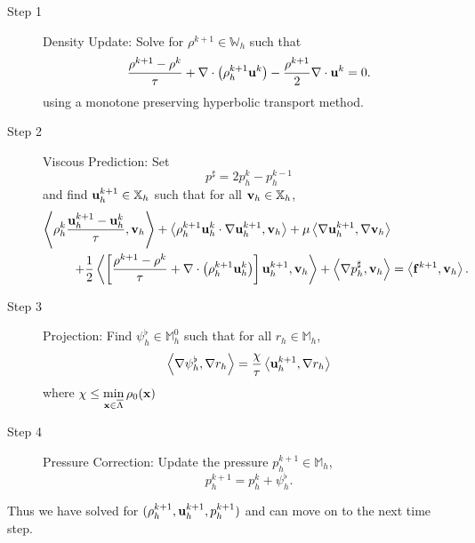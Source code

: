 \documentclass[letterpaper]{erdc}
\begin{document}
\begin{description}
  \item[Step 1] Density Update: Solve for $\rho^{k+1}\in \mathbb{W}_h$ such that
\begin{equation}
  \frac{\rho^{k+1} - \rho^k}{\tau} + \nabla\cdot\left(\rho_h^{k+1}\textbf{u}^{k} \right) - \frac{\rho^{k+1}}{2}\nabla\cdot\textbf{u}^{k} = 0.
\end{equation}
using a monotone preserving hyperbolic transport method.  

\item[Step 2] Viscous Prediction: Set 
\begin{equation}\label{eq:pressureextrapolation_uniformtimestep}
  p^{\sharp} = 2p_h^{k} - p_h^{k-1}
\end{equation}
and find $\textbf{u}^{k+1}_h\in\mathbb{X}_h$ such that for all $\textbf{v}_h\in\mathbb{X}_h$,
\begin{equation}
  \begin{split}
\left\langle  \rho_h^{k}\frac{\textbf{u}_h^{k+1}-\textbf{u}_h^{k} }{\tau} , \textbf{v}_h \right\rangle + \left\langle  \rho_h^{k+1}\textbf{u}_h^{k}\cdot\nabla\textbf{u}_h^{k+1} , \textbf{v}_h \right\rangle + \mu\left\langle  \nabla \textbf{u}_h^{k+1} , \nabla\textbf{v}_h \right\rangle& \\
+ \frac{1}{2}\left\langle \left[\frac{\rho^{k+1}-\rho^{k}}{\tau} + \nabla\cdot\left(\rho_h^{k+1}\textbf{u}_h^{k}\right)\right]\textbf{u}_h^{k+1} , \textbf{v}_h \right\rangle +\left\langle \nabla p_h^{\sharp}, \textbf{v}_h \right\rangle &= \left\langle \mathbf{f}^{k+1}, \textbf{v}_h \right\rangle.
\end{split}
\end{equation}

\item[Step 3] Projection: Find $\psi_h^{\flat}\in \mathbb{M}_h^0$ such that for all $r_h\in \mathbb{M}_h$,
\begin{equation}
  \left\langle \nabla\psi_h^{\flat}, \nabla r_h \right\rangle = \frac{\chi}{\tau}\left\langle \textbf{u}_h^{k+1}, \nabla r_h \right\rangle
\end{equation}
where $\chi \leq \displaystyle\min_{\textbf{x}\in\overline{\Lambda}}\rho_0(\textbf{x})$ 

\item[Step 4] Pressure Correction: Update the pressure $p_h^{k+1}\in \mathbb{M}_h$, 
\begin{equation}
p^{k+1}_h = p^{k}_h + \psi^{\flat}_h.
\end{equation}
\end{description}
Thus we have solved for $(\rho_h^{k+1}, \textbf{u}_h^{k+1}, p_h^{k+1})$ and can move on to the next time step.
\end{document}
